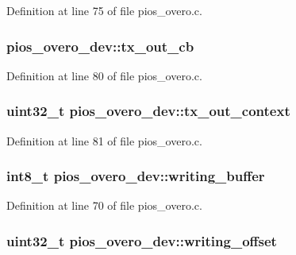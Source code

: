 \-Definition at line 75 of file pios\-\_\-overo.\-c.

\hypertarget{structpios__overo__dev_a6814eae0437a37c8b5319b0ef88b7459}{
\subsubsection[{tx\-\_\-out\-\_\-cb}]{ {\bf pios\-\_\-overo\-\_\-dev\-::tx\-\_\-out\-\_\-cb}}}\label{structpios__overo__dev_a6814eae0437a37c8b5319b0ef88b7459}


\-Definition at line 80 of file pios\-\_\-overo.\-c.

\hypertarget{structpios__overo__dev_aae8b1053ce480f2829ac18c7a490c010}{
\subsubsection[{tx\-\_\-out\-\_\-context}]{\setlength{\rightskip}{0pt plus 5cm}uint32\-\_\-t {\bf pios\-\_\-overo\-\_\-dev\-::tx\-\_\-out\-\_\-context}}}\label{structpios__overo__dev_aae8b1053ce480f2829ac18c7a490c010}


\-Definition at line 81 of file pios\-\_\-overo.\-c.

\hypertarget{structpios__overo__dev_a87dbb1f454559bb6df624368972b0cf6}{
\subsubsection[{writing\-\_\-buffer}]{\setlength{\rightskip}{0pt plus 5cm}int8\-\_\-t {\bf pios\-\_\-overo\-\_\-dev\-::writing\-\_\-buffer}}}\label{structpios__overo__dev_a87dbb1f454559bb6df624368972b0cf6}


\-Definition at line 70 of file pios\-\_\-overo.\-c.

\hypertarget{structpios__overo__dev_a8fc21eb0e95dfbe473205d659e4678f4}{
\subsubsection[{writing\-\_\-offset}]{\setlength{\rightskip}{0pt plus 5cm}uint32\-\_\-t {\bf pios\-\_\-overo\-\_\-dev\-::writing\-\_\-offset}}}\label{structpios__overo__dev_a8fc21eb0e95dfbe473205d659e4678f4}


